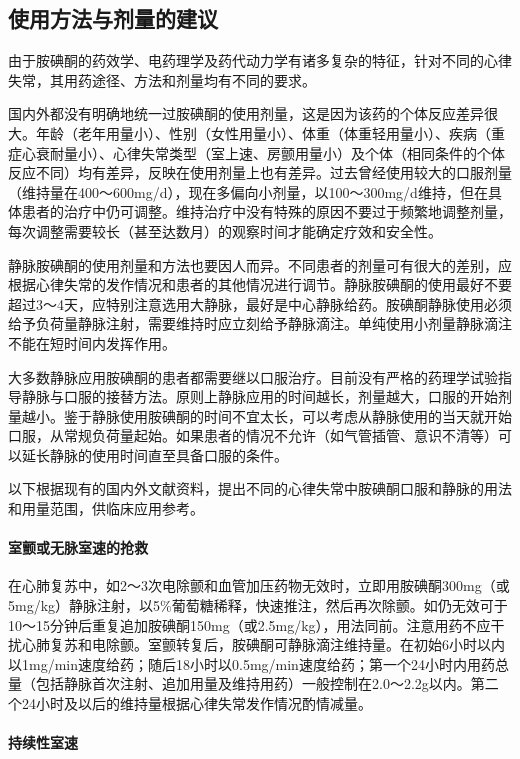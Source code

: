 \subsection{使用方法与剂量的建议}

由于胺碘酮的药效学、电药理学及药代动力学有诸多复杂的特征，针对不同的心律失常，其用药途径、方法和剂量均有不同的要求。

国内外都没有明确地统一过胺碘酮的使用剂量，这是因为该药的个体反应差异很大。年龄（老年用量小）、性别（女性用量小）、体重（体重轻用量小）、疾病（重症心衰耐量小）、心律失常类型（室上速、房颤用量小）及个体（相同条件的个体反应不同）均有差异，反映在使用剂量上也有差异。过去曾经使用较大的口服剂量（维持量在400～600mg/d），现在多偏向小剂量，以100～300mg/d维持，但在具体患者的治疗中仍可调整。维持治疗中没有特殊的原因不要过于频繁地调整剂量，每次调整需要较长（甚至达数月）的观察时间才能确定疗效和安全性。

静脉胺碘酮的使用剂量和方法也要因人而异。不同患者的剂量可有很大的差别，应根据心律失常的发作情况和患者的其他情况进行调节。静脉胺碘酮的使用最好不要超过3～4天，应特别注意选用大静脉，最好是中心静脉给药。胺碘酮静脉使用必须给予负荷量静脉注射，需要维持时应立刻给予静脉滴注。单纯使用小剂量静脉滴注不能在短时间内发挥作用。

大多数静脉应用胺碘酮的患者都需要继以口服治疗。目前没有严格的药理学试验指导静脉与口服的接替方法。原则上静脉应用的时间越长，剂量越大，口服的开始剂量越小。鉴于静脉使用胺碘酮的时间不宜太长，可以考虑从静脉使用的当天就开始口服，从常规负荷量起始。如果患者的情况不允许（如气管插管、意识不清等）可以延长静脉的使用时间直至具备口服的条件。

以下根据现有的国内外文献资料，提出不同的心律失常中胺碘酮口服和静脉的用法和用量范围，供临床应用参考。

\paragraph{室颤或无脉室速的抢救}

在心肺复苏中，如2～3次电除颤和血管加压药物无效时，立即用胺碘酮300mg（或5mg/kg）静脉注射，以5\%葡萄糖稀释，快速推注，然后再次除颤。如仍无效可于10～15分钟后重复追加胺碘酮150mg（或2.5mg/kg），用法同前。注意用药不应干扰心肺复苏和电除颤。室颤转复后，胺碘酮可静脉滴注维持量。在初始6小时以内以1mg/min速度给药；随后18小时以0.5mg/min速度给药；第一个24小时内用药总量（包括静脉首次注射、追加用量及维持用药）一般控制在2.0～2.2g以内。第二个24小时及以后的维持量根据心律失常发作情况酌情减量。

\paragraph{持续性室速}

